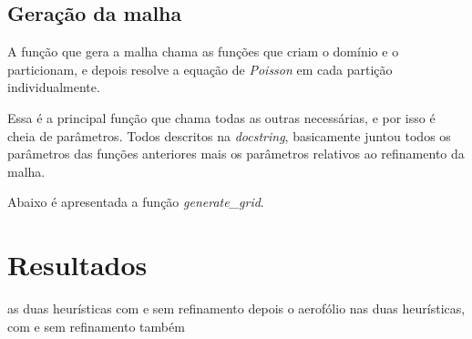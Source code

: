 \documentclass[a4paper]{article}
\begin{document}


\subsection{Geração da malha}

A função que gera a malha chama as funções que criam o domínio e o particionam, e depois resolve a equação de \textit{Poisson} em cada partição individualmente.

Essa é a principal função que chama todas as outras necessárias, e por isso é cheia de parâmetros. Todos descritos na \textit{docstring}, basicamente juntou todos os parâmetros das funções anteriores mais os parâmetros relativos ao refinamento da malha.

Abaixo é apresentada a função \textit{generate\_grid}.





\section{Resultados}

as duas heurísticas com e sem refinamento
depois o aerofólio nas duas heurísticas, com e sem refinamento também
\end{document}
